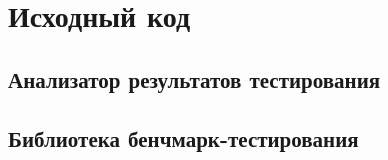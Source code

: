 \chapter{Исходный код}
\section{Анализатор результатов тестирования}
\label{application:analyser}

\section{Библиотека бенчмарк-тестирования}
\label{application:lib}

